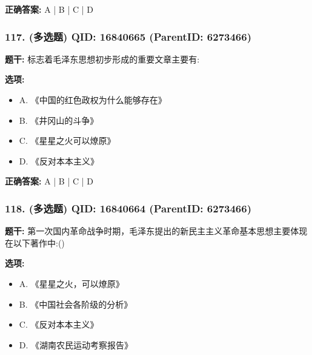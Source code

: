 \documentclass[12pt,UTF8]{ctexart}
\begin{document}
\textbf{正确答案:}
A | B | C | D

\vspace{0.3em}\hrulefill\vspace{0.7em}

\subsubsection*{117. (多选题) \small QID: 16840665 (ParentID: 6273466)}

\textbf{题干:}
标志着毛泽东思想初步形成的重要文章主要有:



\textbf{选项:}
\begin{itemize}[leftmargin=*]

  \item A. 《中国的红色政权为什么能够存在》

  \item B. 《井冈山的斗争》

  \item C. 《星星之火可以燎原》

  \item D. 《反对本本主义》

\end{itemize}

\textbf{正确答案:}
A | B | C | D

\vspace{0.3em}\hrulefill\vspace{0.7em}

\subsubsection*{118. (多选题) \small QID: 16840664 (ParentID: 6273466)}

\textbf{题干:}
第一次国内革命战争时期，毛泽东提出的新民主主义革命基本思想主要体现在以下著作中:()



\textbf{选项:}
\begin{itemize}[leftmargin=*]

  \item A. 《星星之火，可以燎原》

  \item B. 《中国社会各阶级的分析》

  \item C. 《反对本本主义》

  \item D. 《湖南农民运动考察报告》

\end{itemize}
\end{document}
